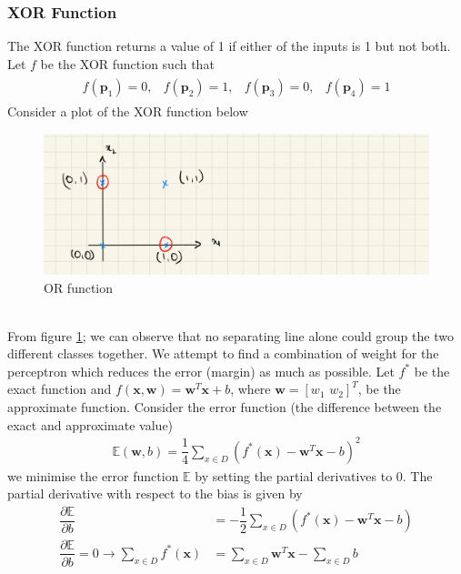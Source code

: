 \subsubsection*{XOR Function}
The XOR function returns a value of 1 if either of the inputs is 1 but not both. Let $f$ be the XOR function such that
\begin{align}
  \begin{matrix}
    f(\textbf{p}_1)=0,&   f(\textbf{p}_2)=1 ,& f(\textbf{p}_3)=0,&   f(\textbf{p}_4)=1
    \label{eq:XOR_function}    
  \end{matrix}
\end{align}
Consider a plot of the XOR function below 
\begin{figure}[ht]
  \centering
  \includegraphics[scale=0.15]{CHAPTER_2/c2_rig_XOR.jpeg}
  \caption{OR function}
  \label{XOR_function}
\end{figure}\\
From figure \ref{XOR_function}; we can observe that no separating line alone could group the two different classes together. We attempt to find a combination of weight for the perceptron which reduces the error (margin) as much as possible. Let $f^{*}$ be the exact function and $f(\textbf{x},\textbf{w}) = \textbf{w}^T\textbf{x} + b$, where $\textbf{w} = [w_1 \, \, w_2]^T$, be the approximate function. Consider the error function (the difference between the exact and approximate value)
\begin{align}
  \label{eq:error_XOR_prob}
  \mathbb{E}(\textbf{w},b) = \dfrac{1}{4} \sum_{x\in D}(f^{*}(\textbf{x})- \textbf{w}^T\textbf{x}-b)^2
\end{align}
we minimise the error function $\mathbb{E}$ by setting the partial derivatives to 0. The partial derivative with respect to the bias is given by
\begin{align}
  \nonumber
  \dfrac{\partial \mathbb{E}}{\partial b} &= -\dfrac{1}{2} \sum_{x\in D}(f^{*}(\textbf{x})- \textbf{w}^T\textbf{x}-b)\\
  \label{eq:bias_derivative}
  \dfrac{\partial \mathbb{E}}{\partial b} = 0\rightarrow \sum_{x\in D}f^{*}(\textbf{x}) &= \sum_{x\in D}\textbf{w}^T\textbf{x}- \sum_{x\in D}b
\end{align}
